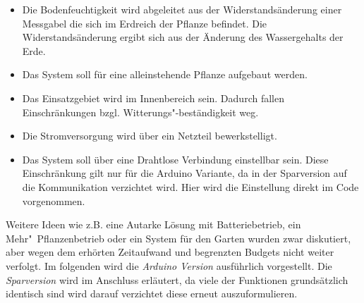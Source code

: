 \documentclass[]{IEEEtran}
\begin{document}
\begin{itemize}
	\item Die Bodenfeuchtigkeit wird abgeleitet aus der Widerstandsänderung einer Messgabel die sich im Erdreich der Pflanze befindet. Die Widerstandsänderung ergibt sich aus der Änderung des Wassergehalts der Erde.
	\item Das System soll für eine alleinstehende Pflanze aufgebaut werden. 
	\item Das Einsatzgebiet wird im Innenbereich sein. Dadurch fallen Einschränkungen bzgl. Witterungs"-beständigkeit weg.
	\item Die Stromversorgung wird über ein Netzteil bewerkstelligt. 
	\item Das System soll über eine Drahtlose Verbindung einstellbar sein. Diese Einschränkung gilt nur für die Arduino Variante, da in der Sparversion auf die Kommunikation verzichtet wird. Hier wird die Einstellung direkt im Code vorgenommen.

\end{itemize}

Weitere Ideen wie z.B. eine Autarke Lösung mit Batteriebetrieb, ein Mehr"~Pflanzenbetrieb oder ein System für den Garten wurden zwar diskutiert, aber wegen dem erhörten Zeitaufwand und begrenzten Budgets nicht weiter verfolgt. 
Im folgenden wird die \emph{Arduino Version} ausführlich vorgestellt. 
Die \emph{Sparversion} wird im Anschluss erläutert, da viele der Funktionen grundsätzlich identisch sind wird darauf verzichtet diese erneut auszuformulieren. 






%
\end{document}
